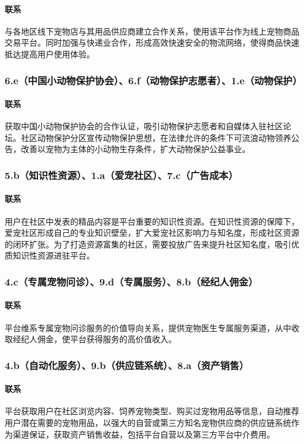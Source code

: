 \documentclass[a4paper]{ctexart}
\begin{document}
\paragraph{联系}与各地区线下宠物店与其用品供应商建立合作关系，使用该平台作为线上宠物商品交易平台。同时加强与快递业合作，形成高效快速安全的物流网络，使得商品快速抵达提高用户使用体验。
\subsubsection{6.e（中国小动物保护协会）、6.f（动物保护志愿者）、1.e（动物保护）}
\paragraph{联系}获取中国小动物保护协会的合作认证，吸引动物保护志愿者和自媒体入驻社区论坛。社区动物保护分区宣传动物保护思想，在法律允许的条件下可流浪动物领养公告，改善以宠物为主体的小动物生存条件，扩大动物保护公益事业。
\subsubsection{5.b（知识性资源）、1.a（爱宠社区）、7.c（广告成本）}
\paragraph{联系}用户在社区中发表的精品内容是平台重要的知识性资源。在知识性资源的保障下，爱宠社区形成自己的专业知识壁垒，扩大爱宠社区影响力与知名度，形成社区资源的闭环扩张。为了打造资源富集的社区，需要投放广告来提升社区知名度，吸引优质知识性资源进驻平台。
\subsubsection{4.c（专属宠物问诊）、9.d（专属服务）、8.b（经纪人佣金）}
\paragraph{联系}平台维系专属宠物问诊服务的价值导向关系，提供宠物医生专属服务渠道，从中收取经纪人佣金，使平台获得服务的高价值收入。
\subsubsection{4.b（自动化服务）、9.b（供应链系统）、8.a（资产销售）}
\paragraph{联系}平台获取用户在社区浏览内容、饲养宠物类型、购买过宠物用品等信息，自动推荐用户潜在需要的宠物用品，以强大的自营或第三方知名宠物供应商的供应链系统作为渠道保证，获取资产销售收益，包括平台自营以及第三方平台中介费用。
\end{document}
